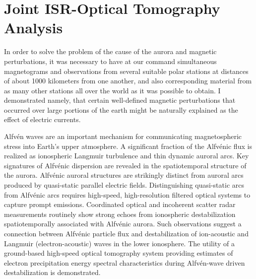 \chapter{Joint ISR-Optical Tomography Analysis}
\label{chapter:fusion}
\thispagestyle{myheadings}

\graphicspath{{Fusion/}}

\epigraph{In order to solve the problem of the cause of the aurora and magnetic perturbations, it was necessary to have at our command simultaneous magnetograms and observations from several suitable polar stations at distances of about 1000 kilometers from one another, and also corresponding material from as many other stations all over the world as it was possible to obtain. I demonstrated namely, that certain well-defined magnetic perturbations that occurred over large portions of the earth might be naturally explained as the effect of electric currents.}{\citep{birkeland1908}}

Alfvén waves are an important mechanism for communicating magnetospheric stress into Earth's upper atmosphere.
A significant fraction of the Alfvénic flux is realized as ionospheric Langmuir turbulence and thin dynamic auroral arcs.
Key signatures of Alfvénic dispersion are revealed in the spatiotemporal structure of the aurora. 
Alfvénic auroral structures are strikingly distinct from auroral arcs produced by quasi-static parallel electric fields.
Distinguishing quasi-static arcs from Alfvénic arcs requires high-speed, high-resolution filtered optical systems to capture prompt emissions.
Coordinated optical and incoherent scatter radar measurements routinely show strong echoes from ionospheric destabilization spatiotemporally associated with Alfvénic aurora.
Such observations suggest a connection between Alfvénic particle flux and destabilization of ion-acoustic and Langmuir (electron-acoustic) waves in the lower ionosphere.
The utility of a ground-based high-speed optical tomography system providing estimates of electron precipitation energy spectral characteristics during Alfvén-wave driven destabilization is demonstrated.




